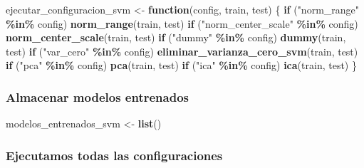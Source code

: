 \documentclass[
]{article}
\newenvironment{Shaded}{\begin{snugshade}}{\end{snugshade}}
\newcommand{\ControlFlowTok}[1]{\textcolor[rgb]{0.13,0.29,0.53}{\textbf{#1}}}
\newcommand{\FunctionTok}[1]{\textcolor[rgb]{0.13,0.29,0.53}{\textbf{#1}}}
\newcommand{\NormalTok}[1]{#1}
\newcommand{\OtherTok}[1]{\textcolor[rgb]{0.56,0.35,0.01}{#1}}
\newcommand{\SpecialCharTok}[1]{\textcolor[rgb]{0.81,0.36,0.00}{\textbf{#1}}}
\newcommand{\StringTok}[1]{\textcolor[rgb]{0.31,0.60,0.02}{#1}}
\begin{document}
\begin{Shaded}
\begin{Highlighting}[]
\NormalTok{ejecutar\_configuracion\_svm }\OtherTok{\textless{}{-}} \ControlFlowTok{function}\NormalTok{(config, train, test) \{}
  \ControlFlowTok{if}\NormalTok{ (}\StringTok{"norm\_range"} \SpecialCharTok{\%in\%}\NormalTok{ config) }\FunctionTok{norm\_range}\NormalTok{(train, test)}
  \ControlFlowTok{if}\NormalTok{ (}\StringTok{"norm\_center\_scale"} \SpecialCharTok{\%in\%}\NormalTok{ config) }\FunctionTok{norm\_center\_scale}\NormalTok{(train, test)}
  \ControlFlowTok{if}\NormalTok{ (}\StringTok{"dummy"} \SpecialCharTok{\%in\%}\NormalTok{ config) }\FunctionTok{dummy}\NormalTok{(train, test)}
  \ControlFlowTok{if}\NormalTok{ (}\StringTok{"var\_cero"} \SpecialCharTok{\%in\%}\NormalTok{ config) }\FunctionTok{eliminar\_varianza\_cero\_svm}\NormalTok{(train, test)}
  \ControlFlowTok{if}\NormalTok{ (}\StringTok{"pca"} \SpecialCharTok{\%in\%}\NormalTok{ config) }\FunctionTok{pca}\NormalTok{(train, test)}
  \ControlFlowTok{if}\NormalTok{ (}\StringTok{"ica"} \SpecialCharTok{\%in\%}\NormalTok{ config) }\FunctionTok{ica}\NormalTok{(train, test)}
\NormalTok{\}}
\end{Highlighting}
\end{Shaded}

\hypertarget{almacenar-modelos-entrenados-1}{%
\subsubsection{Almacenar modelos
entrenados}\label{almacenar-modelos-entrenados-1}}

\begin{Shaded}
\begin{Highlighting}[]
\NormalTok{modelos\_entrenados\_svm }\OtherTok{\textless{}{-}} \FunctionTok{list}\NormalTok{()}
\end{Highlighting}
\end{Shaded}

\hypertarget{ejecutamos-todas-las-configuraciones-1}{%
\subsubsection{Ejecutamos todas las
configuraciones}\label{ejecutamos-todas-las-configuraciones-1}}
\end{document}
